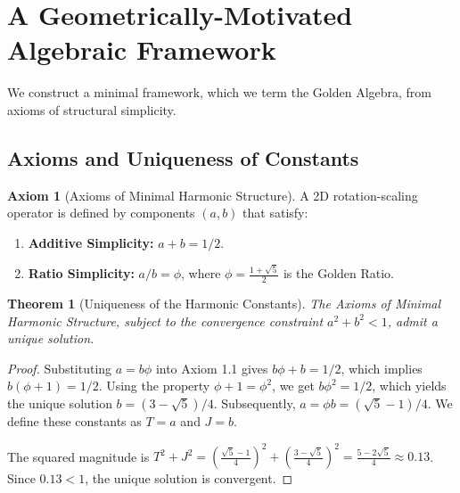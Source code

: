 \documentclass{amsart}
\theoremstyle{plain}
\newtheorem{theorem}{Theorem}[section]
\theoremstyle{definition}
\newtheorem{axiom}{Axiom}
\theoremstyle{remark}
\begin{document}
\section{A Geometrically-Motivated Algebraic Framework}
We construct a minimal framework, which we term the Golden Algebra, from axioms of structural simplicity.

\subsection{Axioms and Uniqueness of Constants}
\begin{axiom}[Axioms of Minimal Harmonic Structure]
A 2D rotation-scaling operator is defined by components $(a,b)$ that satisfy:
\begin{enumerate}
    \item \textbf{Additive Simplicity:} $a+b = 1/2$. 
    \item \textbf{Ratio Simplicity:} $a/b = \phi$, where $\phi = \frac{1+\sqrt{5}}{2}$ is the Golden Ratio. 
\end{enumerate}
\end{axiom}

\begin{theorem}[Uniqueness of the Harmonic Constants]
The Axioms of Minimal Harmonic Structure, subject to the convergence constraint $a^2+b^2 < 1$, admit a unique solution. 
\end{theorem}
\begin{proof}
Substituting $a=b\phi$ into Axiom 1.1 gives $b\phi+b=1/2$, which implies $b(\phi+1)=1/2$. Using the property $\phi+1=\phi^2$, we get $b\phi^2=1/2$, which yields the unique solution $b=(3-\sqrt{5})/4$. Subsequently, $a=\phi b = (\sqrt{5}-1)/4$.  We define these constants as $T=a$ and $J=b$. 

The squared magnitude is $T^2+J^2 = \left(\frac{\sqrt{5}-1}{4}\right)^2 + \left(\frac{3-\sqrt{5}}{4}\right)^2 = \frac{5-2\sqrt{5}}{4} \approx 0.13$.  Since $0.13 < 1$, the unique solution is convergent. 
\end{proof}
\end{document}
